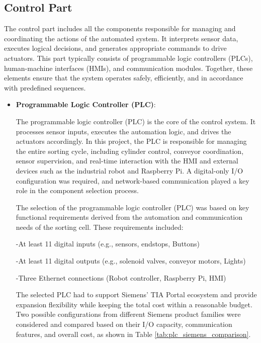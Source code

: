 \subsection{Control Part}
The control part includes all the components responsible for managing and coordinating the actions of the automated system. It interprets sensor data, executes logical decisions, and generates appropriate commands to drive actuators. This part typically consists of programmable logic controllers (PLCs), human-machine interfaces (HMIs), and communication modules. Together, these elements ensure that the system operates safely, efficiently, and in accordance with predefined sequences.

\begin{itemize}
    \item \textbf{Programmable Logic Controller (PLC)}:

    The programmable logic controller (PLC) is the core of the control system. It processes sensor inputs, executes the automation logic, and drives the actuators accordingly. In this project, the PLC is responsible for managing the entire sorting cycle, including cylinder control, conveyor coordination, sensor supervision, and real-time interaction with the HMI and external devices such as the industrial robot and Raspberry Pi. A digital-only I/O configuration was required, and network-based communication played a key role in the component selection process.


    The selection of the programmable logic controller (PLC) was based on key functional requirements derived from the automation and communication needs of the sorting cell. These requirements included:
    
    -At least 11 digital inputs (e.g., sensors, endstops, Buttons)
    
    -At least 11 digital outputs (e.g., solenoid valves, conveyor motors, Lights)
    
    -Three Ethernet connections (Robot controller, Raspberry Pi, HMI)

    The selected PLC had to support Siemens' TIA Portal ecosystem and provide expansion flexibility while keeping the total cost within a reasonable budget. Two possible configurations from different Siemens product families were considered and compared based on their I/O capacity, communication features, and overall cost, as shown in Table \ref{tab:plc_siemens_comparison}.
    \renewcommand{\arraystretch}{1.3}
    \setlength{\tabcolsep}{8pt}


\end{itemize}
